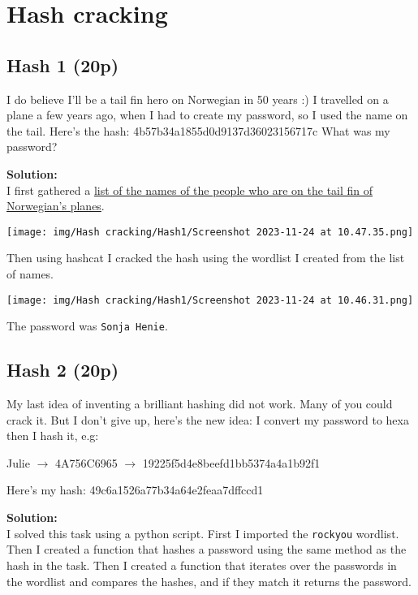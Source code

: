 \section{Hash cracking}

\subsection{Hash 1 (20p)}
\addtocounter{points}{20}
I do believe I'll be a tail fin hero on Norwegian in 50 years :) I travelled on a plane a few years ago, when I had to create my password, so I used the name on the tail. Here's the hash: 4b57b34a1855d0d9137d36023156717c What was my password?

\textbf{Solution:}\\
I first gathered a \href{https://en.wikipedia.org/wiki/List_of_Norwegian_Air_Shuttle_tail_fin_heroes_and_fleet}{list of the names of the people who are on the tail fin of Norwegian's planes}.

\begin{center}
    \texttt{[image: img/Hash cracking/Hash1/Screenshot 2023-11-24 at 10.47.35.png]}
\end{center}

Then using hashcat I cracked the hash using the wordlist I created from the list of names.

\begin{center}
    \texttt{[image: img/Hash cracking/Hash1/Screenshot 2023-11-24 at 10.46.31.png]}
\end{center}

The password was \texttt{Sonja Henie}.

\newpage
\subsection{Hash 2 (20p)}
\addtocounter{points}{20}
My last idea of inventing a brilliant hashing did not work. Many of you could crack it. But I don't give up, here's the new idea: I convert my password to hexa then I hash it, e.g:

Julie \(\rightarrow\) 4A756C6965 \(\rightarrow\) 19225f5d4e8beefd1bb5374a4a1b92f1

Here's my hash: 49c6a1526a77b34a64e2feaa7dffccd1

\textbf{Solution:}\\
I solved this task using a python script. First I imported the \texttt{rockyou} wordlist.
Then I created a function that hashes a password using the same method as the hash in the task.
Then I created a function that iterates over the passwords in the wordlist and compares the hashes, and if they match it returns the password.

